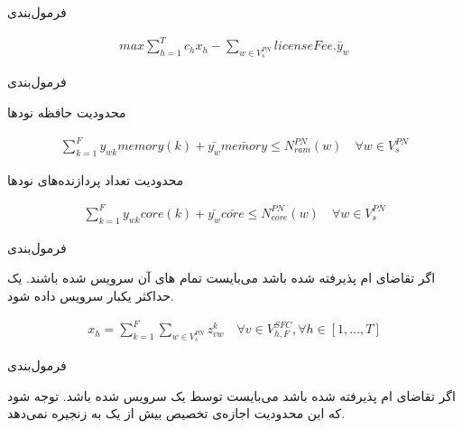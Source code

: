 \documentclass{beamer}
\begin{document}
\begin{persian}
\begin{frame}{فرمول‌بندی}
    \begin{latin}\begin{align}
        max \sum_{h=1}^{T} c_hx_h - \sum_{w \in V_s^{PN}} licenseFee . \bar{y}_w
    \end{align}\end{latin}
\end{frame}
\begin{frame}{فرمول‌بندی}
    \par
    محدودیت حافظه نودها
    \begin{latin}\begin{align}
        \sum_{k=1}^F y_{wk} memory(k) + \bar{y_w} \bar{memory} \le N_{ram}^{PN}(w)
        \quad
        \forall w \in V_s^{PN}
    \end{align}\end{latin}
    \par
    محدودیت تعداد پردازنده‌های نودها
    \begin{latin}\begin{align}
        \sum_{k=1}^F y_{wk} core(k) + \bar{y_w} \bar{core} \le N_{core}^{PN}(w)
        \quad
        \forall w \in V_s^{PN}
    \end{align}\end{latin}
\end{frame}
\begin{frame}{فرمول‌بندی}
    \par
    اگر تقاضای ام پذیرفته شده باشد
    می‌بایست تمام های آن‌
    سرویس شده باشند.
    یک  حداکثر یکبار سرویس داده شود.
    \begin{latin}\begin{align}
        x_h = \sum_{k=1}^{F} \sum_{w \in V_{s}^{PN}} z_{vw}^{k}
        \quad
        \forall v \in V_{h,F}^{SFC}, \forall h \in [1,\ldots, T]
    \end{align}\end{latin}
\end{frame}
\begin{frame}{فرمول‌بندی}
    \par
    اگر تقاضای ام پذیرفته شده باشد
    می‌بایست توسط یک  سرویس شده باشد.
    توجه شود که این محدودیت اجازه‌ی تخصیص بیش از یک 
    به زنجیره نمی‌دهد.
    \begin{latin}\begin{align}

\end{align}
\end{latin}
\end{frame}
\end{persian}
\end{document}
